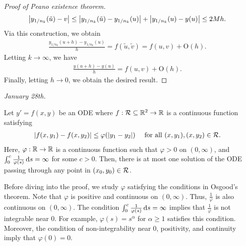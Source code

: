 \begin{proof}[Proof of Peano existence theorem]
    \begin{align}
        \left| y_{1/n_{k}}(\tilde{u}) - v \right| \leq \left| y_{1/n_{k}}(\tilde{u}) - y_{1/n_{k}}(u) \right| + \left| y_{1/n_{k}}(u) - y(u) \right| \leq 2Mh.
    \end{align}
    Via this construction, we obtain
    \begin{align}
        \frac{y_{1/n_{k}}(u+h)-y_{1/n_{k}}(u)}{h} = f(\tilde{u},\tilde{v}) = f(u,v) + \mathrm{O}(h).
    \end{align}
    Letting $k \to \infty$, we have
    \begin{align}
        \frac{y(u+h)-y(u)}{h} = f(u,v) + \mathrm{O}(h).
    \end{align}
    Finally, letting $h \to 0$, we obtain the desired result.
\end{proof}

\noindent \textit{January 28th.}

\begin{theorem}
    Let $y' = f(x,y)$ be an ODE where $f:\mathcal{R} \subseteq \mathbb{R}^{2} \to \mathbb{R}$ is a continuous function satisfying
    \begin{align}
        \left| f(x,y_{1})-f(x,y_{2}) \right| \leq \varphi(\left| y_{1}-y_{2} \right|) \quad \text{ for all } (x,y_{1}),(x,y_{2}) \in \mathcal{R}.
    \end{align}
    Here, $\varphi:\mathbb{R} \to \mathbb{R}$ is a continuous function such that $\varphi > 0$ on $(0,\infty)$, and $\int_{0}^{c} \frac{1}{\varphi(s)} \, \mathrm{d}s = \infty$ for some $c > 0$. Then, there is at most one solution of the ODE passing through any point in $(x_{0},y_{0}) \in \mathcal{R}$.
\end{theorem}

Before diving into the proof, we study $\varphi$ satisfying the conditions in Osgood's theorem. Note that $\varphi$ is positive and continuous on $(0,\infty)$. Thus, $\frac{1}{\varphi}$ is also continuous on $(0,\infty)$. The condition $\int_{0}^{c} \frac{1}{\varphi(s)} \, \mathrm{d}s = \infty$ implies that $\frac{1}{\varphi}$ is not integrable near $0$. For example, $\varphi(s) = s^{\alpha}$ for $\alpha \geq 1$ satisfies this condition. Moreover, the condition of non-integrability near $0$, positivity, and continuity imply that $\varphi(0) = 0$.

